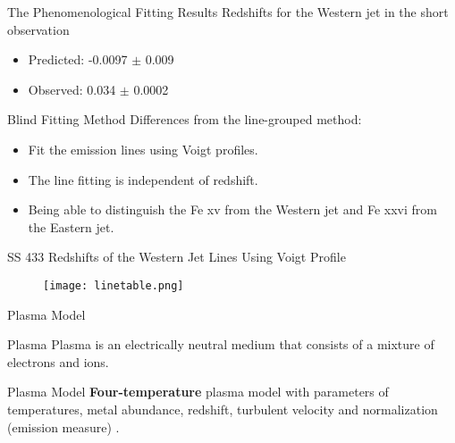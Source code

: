 \documentclass{beamer}
\begin{document}
\begin{frame}{The Phenomenological Fitting Results}
Redshifts for the Western jet in the short observation
\begin{itemize}
    \item Predicted: -0.0097 $\pm$ 0.009
    \item Observed: 0.034 $\pm$ 0.0002
\end{itemize}

\begin{block}{Blind Fitting Method \citep{Marshall2002}}
Differences from the line-grouped method:
    \begin{itemize}
         \item Fit the emission lines using Voigt profiles.
         \item The line fitting is independent of redshift.
         \item Being able to distinguish the Fe {\sc xv} from the Western jet and Fe {\sc xxvi} from the Eastern jet.
    \end{itemize}
\end{block}
    
\end{frame}


\begin{frame}{SS 433 Redshifts of the Western Jet Lines Using Voigt Profile}
\begin{figure}
    \centering
    \texttt{[image: linetable.png]}
    \label{westlongz}
\end{figure}


    
\end{frame}

\begin{frame}{Plasma Model}
    \begin{block}{Plasma}
    Plasma is an electrically neutral medium that consists of a mixture of electrons and ions.
    \end{block}
    \begin{block}{Plasma Model}
    \textbf{Four-temperature} plasma model with parameters of temperatures, metal abundance, redshift, turbulent velocity and normalization (emission measure) \citep{Marshall2002}.
    \end{block}
\end{frame}
\end{document}
